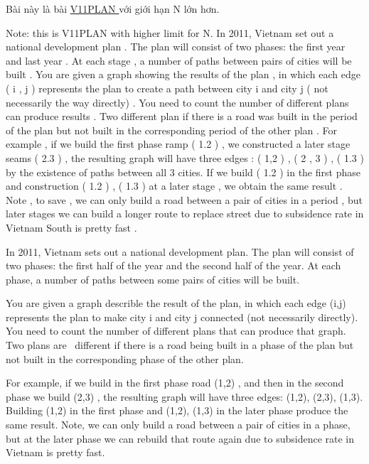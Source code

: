 



    Bài này là bài    \href{http://vn.spoj.com/problems/V11PLAN/}{     V11PLAN    }    với giới hạn N lớn hơn.   

Note: this is V11PLAN with higher limit for N.     In 2011, Vietnam set out a national development plan . The plan will consist of two phases: the first year and last year . At each stage , a number of paths between pairs of cities will be built .       You are given a graph showing the results of the plan , in which each edge ( i , j ) represents the plan to create a path between city i and city j ( not necessarily the way directly) . You need to count the number of different plans can produce results . Two different plan if there is a road was built in the period of the plan but not built in the corresponding period of the other plan .       For example , if we build the first phase ramp ( 1.2 ) , we constructed a later stage seams ( 2.3 ) , the resulting graph will have three edges : ( 1,2 ) , ( 2 , 3 ) , ( 1.3 ) by the existence of paths between all 3 cities. If we build ( 1.2 ) in the first phase and construction ( 1.2 ) , ( 1.3 ) at a later stage , we obtain the same result . Note , to save , we can only build a road between a pair of cities in a period , but later stages we can build a longer route to replace street due to subsidence rate in Vietnam South is pretty fast .    

   In 2011, Vietnam sets out a national development plan. The plan will consist of two phases: the first half of the year and the second half of the year. At each phase, a number of paths between some pairs of cities will be built.  

   You are given a graph describle the result of the plan, in which each edge (i,j) represents the plan to make city i and city j connected (not necessarily directly). You need to count the number of different plans that can produce that graph. Two plans are  different if there is a road being built in a phase of the plan but not built in the corresponding phase of the other plan.  

   For example, if we build in the first phase road (1,2) , and then in the second phase we build (2,3) , the resulting graph will have three edges: (1,2), (2,3), (1,3). Building (1,2) in the first phase and (1,2), (1,3) in the later phase produce the same result. Note, we can only build a road between a pair of cities in a phase, but at the later phase we can rebuild that route again due to subsidence rate in Vietnam is pretty fast.  



